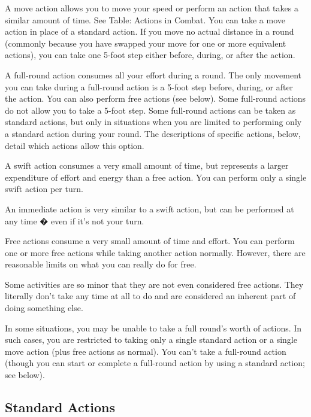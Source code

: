 A move action allows you to move your speed or perform an action that takes a similar amount of time. See Table: Actions in Combat. You can take a move action in place of a standard action. If you move no actual distance in a round (commonly because you have swapped your move for one or more equivalent actions), you can take one 5-foot step either before, during, or after the action.

A full-round action consumes all your effort during a round. The only movement you can take during a full-round action is a 5-foot step before, during, or after the action. You can also perform free actions (see below).
Some full-round actions do not allow you to take a 5-foot step. Some full-round actions can be taken as standard actions, but only in situations when you are limited to performing only a standard action during your round. The descriptions of specific actions, below, detail which actions allow this option.

A swift action consumes a very small amount of time, but represents a larger expenditure of effort and energy than a free action. You can perform only a single swift action per turn. 

An immediate action is very similar to a swift action, but can be performed at any time � even if it's not your turn. 

Free actions consume a very small amount of time and effort. You can perform one or more free actions while taking another action normally. However, there are reasonable limits on what you can really do for free.

Some activities are so minor that they are not even considered free actions. They literally don't take any time at all to do and are considered an inherent part of doing something else.

In some situations, you may be unable to take a full round's worth of actions. In such cases, you are restricted to taking only a single standard action or a single move action (plus free actions as normal). You can't take a full-round action (though you can start or complete a full-round action by using a standard action; see below).


\subsection{Standard Actions}

